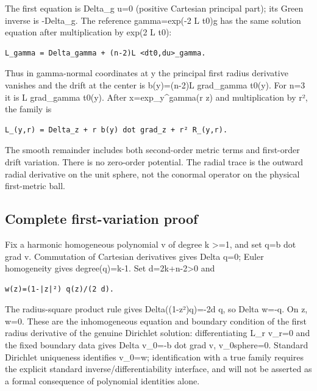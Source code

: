 \documentclass[11pt]{article}
\theoremstyle{definition}
\theoremstyle{remark}
\numberwithin{equation}{section}
\begin{document}
The first equation is Delta\_g u=0 (positive Cartesian principal part);
its Green inverse is -Delta\_g. The reference gamma=exp(-2 L t0)g has
the same solution equation after multiplication by exp(2 L t0):

\begin{verbatim}
L_gamma = Delta_gamma + (n-2)L <dt0,du>_gamma.
\end{verbatim}

Thus in gamma-normal coordinates at y the principal first radius
derivative vanishes and the drift at the center is b(y)=(n-2)L
grad\_gamma t0(y). For n=3 it is L grad\_gamma t0(y). After
x=exp\_y\^{}gamma(r z) and multiplication by r², the family is

\begin{verbatim}
L_(y,r) = Delta_z + r b(y) dot grad_z + r² R_(y,r).
\end{verbatim}

The smooth remainder includes both second-order metric terms and
first-order drift variation. There is no zero-order potential. The
radial trace is the outward radial derivative on the unit sphere, not
the conormal operator on the physical first-metric ball.

\hypertarget{source-bf1ada3d0e91-complete-first-variation-proof}{%
\subsection{Complete first-variation
proof}\label{source-bf1ada3d0e91-complete-first-variation-proof}}

Fix a harmonic homogeneous polynomial v of degree k \textgreater=1, and
set q=b dot grad v. Commutation of Cartesian derivatives gives Delta
q=0; Euler homogeneity gives degree(q)=k-1. Set d=2k+n-2\textgreater0
and

\begin{verbatim}
w(z)=(1-|z|²) q(z)/(2 d).
\end{verbatim}

The radius-square product rule gives Delta((1-\textbar z\textbar²)q)=-2d
q, so Delta w=-q. On \textbar z, w=0. These are the
inhomogeneous equation and boundary condition of the first radius
derivative of the genuine Dirichlet solution: differentiating L\_r
v\_r=0 and the fixed boundary data gives Delta v\textquotesingle\_0=-b
dot grad v, v\textquotesingle\_0\textbar sphere=0. Standard Dirichlet
uniqueness identifies v\textquotesingle\_0=w; identification with a true
family requires the explicit standard inverse/differentiability
interface, and will not be asserted as a formal consequence of
polynomial identities alone.
\end{document}
